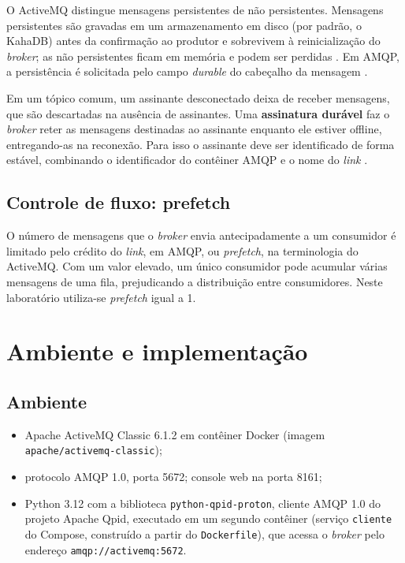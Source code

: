 \documentclass[12pt,a4paper]{article}
\begin{document}
O ActiveMQ distingue mensagens persistentes de não persistentes. Mensagens persistentes são gravadas em um armazenamento em disco (por padrão, o KahaDB) antes da confirmação ao produtor e sobrevivem à reinicialização do \textit{broker}; as não persistentes ficam em memória e podem ser perdidas \cite{snyder2011}. Em AMQP, a persistência é solicitada pelo campo \textit{durable} do cabeçalho da mensagem \cite{oasis2012}.

Em um tópico comum, um assinante desconectado deixa de receber mensagens, que são descartadas na ausência de assinantes. Uma \textbf{assinatura durável} faz o \textit{broker} reter as mensagens destinadas ao assinante enquanto ele estiver offline, entregando-as na reconexão. Para isso o assinante deve ser identificado de forma estável, combinando o identificador do contêiner AMQP e o nome do \textit{link} \cite{snyder2011,activemq}.

\subsection{Controle de fluxo: prefetch}

O número de mensagens que o \textit{broker} envia antecipadamente a um consumidor é limitado pelo crédito do \textit{link}, em AMQP, ou \textit{prefetch}, na terminologia do ActiveMQ. Com um valor elevado, um único consumidor pode acumular várias mensagens de uma fila, prejudicando a distribuição entre consumidores. Neste laboratório utiliza-se \textit{prefetch} igual a 1.

\section{Ambiente e implementação}

\subsection{Ambiente}

\begin{itemize}[nosep]
\item Apache ActiveMQ Classic 6.1.2 em contêiner Docker (imagem \texttt{apache/activemq-classic});
\item protocolo AMQP 1.0, porta 5672; console web na porta 8161;
\item Python 3.12 com a biblioteca \texttt{python-qpid-proton}, cliente AMQP 1.0 do projeto Apache Qpid, executado em um segundo contêiner (serviço \texttt{cliente} do Compose, construído a partir do \texttt{Dockerfile}), que acessa o \textit{broker} pelo endereço \texttt{amqp://activemq:5672}.
\end{itemize}
\end{document}
